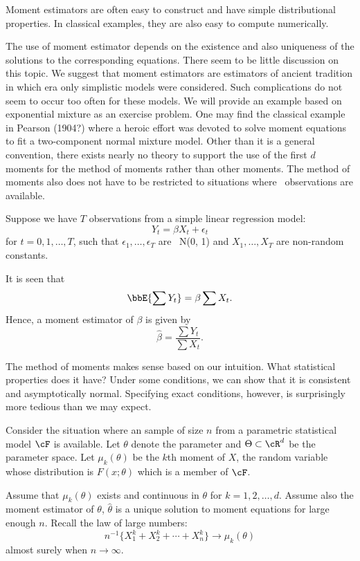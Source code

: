 Moment estimators are often easy to construct and have
simple distributional properties. In classical examples, they
are also easy to compute numerically. 

The use of moment estimator depends on the existence
and also uniqueness of the solutions to the corresponding
equations. There seem to be little discussion on this topic.
We suggest that moment estimators are estimators of ancient
tradition in which era only simplistic models were considered.
Such complications do not seem to occur too often for these
models. We will provide an example based on exponential
mixture as an exercise problem. One may find the classical
example in Pearson (1904?) where a heroic effort was devoted
to solve moment equations to fit a two-component normal
mixture model.
Other than it is a general convention, there exists nearly no theory to
support the use of the first $d$ moments for the method of moments
rather than other moments. 
The method of moments also does not have to be restricted to
situations where \iid\ observations are available.

\begin{example}
Suppose we have $T$ observations from a simple linear regression
model:
\[
Y_t = \beta X_t + \epsilon_t
\]
for $t=0, 1, \ldots, T$,
such that $\epsilon_1, \ldots, \epsilon_T$ are \iid\ N(0, 1)
and $X_1, \ldots, X_T$ are non-random constants.

It is seen that 
\[
\bbE\{ \sum Y_t \} = \beta \sum X_t.
\]
Hence, a moment estimator of $\beta$ is given by
\[
\hat \beta = \frac{\sum Y_t}{\sum X_t}.
\]
\end{example}

The method of moments makes sense based on our intuition.
What statistical properties does it have? Under some conditions,
we can show that it is consistent and asymptotically normal.
Specifying exact conditions, however, is surprisingly more tedious
than we may expect.

Consider the situation where an \iid sample of size $n$ from a 
parametric statistical model $\cF$ is available. 
Let $\theta$ denote the parameter and $\Theta\subset \cR^d$
be the parameter space.
Let $\mu_k(\theta)$ be the $k$th moment of $X$, the random
variable whose distribution is $F(x; \theta)$ which is a member
of $\cF$.

Assume that $\mu_k(\theta)$ exists and
continuous in $\theta$ for $k=1, 2, \ldots, d$.
Assume also the moment estimator of $\theta$,
$\hat \theta$ is a unique solution to moment equations
for large enough $n$.
Recall the law of large numbers: 
\[
n^{-1} \{ X_1^k + X_2^k + \cdots + X_n^k \}
\to \mu_k(\theta)
\] 
almost surely when $n \to \infty$.

